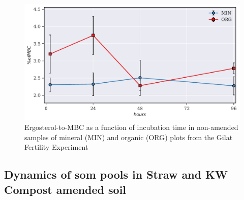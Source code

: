 			\begin{figure}[H]
				\centering
				\includegraphics[scale=0.8]{thesis_figures/preliminary/control/Erg-to-MBC_.pdf}
				\caption{Ergosterol-to-MBC  as a function of incubation time in non-amended samples  of mineral (MIN) and organic (ORG) plots from the Gilat Fertility Experiment}
				\label{fig:erg_to_mbc_control_preliminary}
			\end{figure}
%

    \subsection{Dynamics of \gls{som} pools in Straw and KW Compost amended soil}


